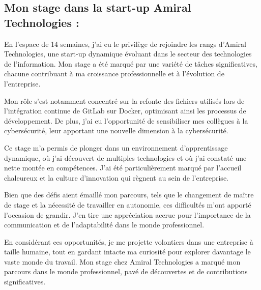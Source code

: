 \subsection*{Mon stage dans la start-up Amiral Technologies :}
En l'espace de 14 semaines, j'ai eu le privilège de rejoindre les rangs d'Amiral Technologies, une start-up dynamique évoluant dans le secteur des technologies de l'information.
Mon stage a été marqué par une variété de tâches significatives, chacune contribuant à ma croissance professionnelle et à l'évolution de l'entreprise.

Mon rôle s'est notamment concentré sur la refonte des fichiers utilisés lors de l'intégration continue de GitLab sur Docker, optimisant ainsi les processus de développement.
De plus, j'ai eu l'opportunité de sensibiliser mes collègues à la cybersécurité, leur apportant une nouvelle dimension à la cybersécurité.

Ce stage m'a permis de plonger dans un environnement d'apprentissage dynamique, où j'ai découvert de multiples technologies et où j'ai constaté une nette montée en compétences.
J'ai été particulièrement marqué par l'accueil chaleureux et la culture d'innovation qui règnent au sein de l'entreprise.

Bien que des défis aient émaillé mon parcours, tels que le changement de maître de stage et la nécessité de travailler en autonomie, ces difficultés m'ont apporté l'occasion de grandir.
J'en tire une appréciation accrue pour l'importance de la communication et de l'adaptabilité dans le monde professionnel.

En considérant ces opportunités, je me projette volontiers dans une entreprise à taille humaine, tout en gardant intacte ma curiosité pour explorer davantage le vaste monde du travail.
Mon stage chez Amiral Technologies a marqué mon parcours dans le monde professionnel, pavé de découvertes et de contributions significatives.
